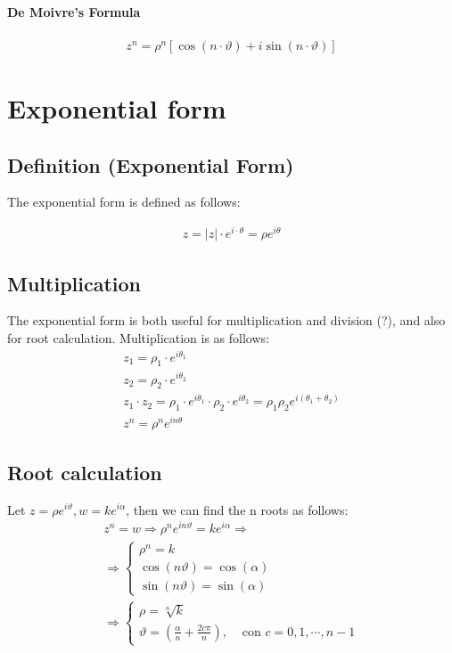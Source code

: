 \documentclass[a4paper]{report}
\begin{document}
\paragraph{\textbf{De Moivre's Formula}}
\begin{align}
z^{n} = \rho ^{n} \left [ \cos\left ( n\cdot \vartheta \right ) + i\sin\left ( n\cdot \vartheta \right ) \right ]
\end{align}

\section{\textbf{Exponential form}}
\subsection{\textbf{Definition (Exponential Form)}}
The exponential form is defined as follows:

\begin{align}
z = \left | z \right |\cdot e^{i\cdot \theta } = \rho e^{i\theta }
\end{align}

\subsection{\textbf{Multiplication}}
The exponential form is both useful for multiplication and division (?), and also for root calculation.
Multiplication is as follows:
\begin{align}
z_{1} = \rho _{1} \cdot e^{i\theta _{1}}\\
z_{2} = \rho _{2} \cdot e^{i\theta _{2}}\\
z_{1}\cdot z_{2} = \rho _{1}\cdot e^{i\theta _{1}}\cdot \rho _{2}\cdot e^{i\theta _{2}}=\rho _{1}\rho _{2}e^{i\left ( \theta _{1} + \theta _{2} \right )}\\
z^{n} = \rho ^{n}e^{in\theta }	
\end{align}





\subsection{\textbf{Root calculation}}
Let $ z = \rho e^{i\vartheta}, w = k e^{i\alpha} $, then we can find the n roots as follows:
\begin{align}
z^{n} = w \Longrightarrow \rho ^{n}e^{in\vartheta} = k e^{i\alpha} \Longrightarrow\\
\Longrightarrow \begin{cases}
\rho ^{n} = k \\
\cos(n\vartheta) = \cos(\alpha) \\
\sin(n\vartheta) = \sin(\alpha)
\end{cases} \\ \Longrightarrow
\begin{cases}
\rho = \sqrt[n]{k}\\
\vartheta = \left ( \frac{\alpha}{n} + \frac{2c\pi }{n} \right ), & \text{ con } c = 0,1,\cdots , n - 1
\end{cases}
\end{align}
\end{document}
